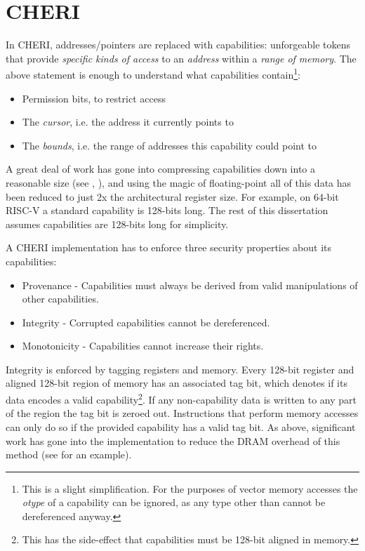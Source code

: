 \section{CHERI}\label{chap:bg:sec:cheri}
In CHERI, addresses/pointers are replaced with capabilities: unforgeable tokens that provide \emph{specific kinds of access} to an \emph{address} within a \emph{range of memory}.
The above statement is enough to understand what capabilities contain\footnote{This is a slight simplification. For the purposes of vector memory accesses the \emph{otype} of a capability can be ignored, as any type other than  cannot be dereferenced anyway.}:
\begin{itemize}
    \item Permission bits, to restrict access
    \item The \emph{cursor}, i.e. the address it currently points to
    \item The \emph{bounds}, i.e. the range of addresses this capability could point to
\end{itemize}
A great deal of work has gone into compressing capabilities down into a reasonable size (see \cite{woodruffCHERIConcentratePractical2019}, ), and using the magic of floating-point all of this data has been reduced to just 2x the architectural register size.
For example, on 64-bit RISC-V a standard capability is 128-bits long.
The rest of this dissertation assumes capabilities are 128-bits long for simplicity.

A CHERI implementation has to enforce three security properties about its capabilities:
\begin{itemize}
    \item Provenance - Capabilities must always be derived from valid manipulations of other capabilities.
    \item Integrity - Corrupted capabilities cannot be dereferenced.
    \item Monotonicity - Capabilities cannot increase their rights.
\end{itemize}

Integrity is enforced by tagging registers and memory.
Every 128-bit register and aligned 128-bit region of memory has an associated tag bit, which denotes if its data encodes a valid capability\footnote{This has the side-effect that capabilities must be 128-bit aligned in memory.}.
If any non-capability data is written to any part of the region the tag bit is zeroed out.
Instructions that perform memory accesses can only do so if the provided capability has a valid tag bit.
As above, significant work has gone into the implementation to reduce the DRAM overhead of this method (see \cite{joannouEfficientTaggedMemory2017} for an example).

